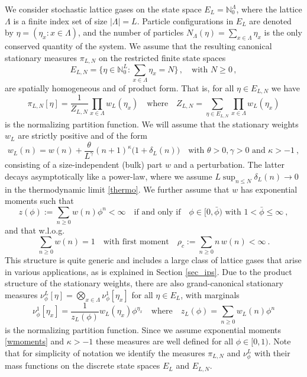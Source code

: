 \documentclass[pdflatex,sn-mathphys-num]{sn-jnl}%
\theoremstyle{thmstyleone}%
\theoremstyle{thmstyletwo}%
\theoremstyle{thmstylethree}%
\begin{document}
We consider stochastic lattice gases on the state space $E_L =\mathbb{N}_0^\Lambda$, where the lattice $\Lambda$ is a finite index set of size $|\Lambda |=L$. Particle configurations in $E_L$ are denoted by $\eta =(\eta_x :x\in\Lambda)$, and the number of particles $N_\Lambda (\eta )=\sum\limits_{x\in\Lambda} \eta_x$ is the only conserved quantity of the system. We assume that the resulting canonical stationary measures $\pi_{L,N}$ on the restricted finite state spaces
\[
    E_{L,N} = \{\eta \in \mathbb{N}_0^L: \sum_{x \in \Lambda} \eta_x = N\}\,,\quad\text{with }N\geq 0\,,
\]
are spatially homogeneous and of product form. That is, for all $\eta\in E_{L,N}$ we have
\begin{equation}\label{canon}
\pi_{L,N} [\eta ]=\frac{1}{Z_{L,N}} \prod_{x\in\Lambda} w_L (\eta_x )\quad\mbox{where}\quad Z_{L,N} =\sum_{\eta\in E_{L,N}} \prod_{x\in\Lambda} w_L (\eta_x )
\end{equation}
is the normalizing partition function. We will assume that the stationary weights $w_L$ are strictly positive and of the form
\begin{equation}\label{weights}
    w_L (n)=w(n)+\frac{\theta}{L^\gamma} (n+1)^\kappa \big( 1+\delta_L (n)\big)\quad\mbox{with }\theta 
    >0,\gamma >0\mbox{ and }\kappa >-1\ ,
\end{equation}
consisting of a size-independent (bulk) part $w$ and a perturbation. The latter decays asymptotically like a power-law, where we assume $L\sup_{n\leq N} \delta_L (n)\to 0$ in the thermodynamic limit \eqref{thermo}. We further assume that $w$ has exponential moments such that
\begin{equation}\label{exmoments}
    z(\phi ):=\sum_{n\geq 0} w(n)\phi^n <\infty\quad\mbox{if and only if}\quad\phi \in [0,\bar\phi)\mbox{ with }1<\bar\phi \leq\infty\ ,
\end{equation}
and that w.l.o.g.
\begin{equation}
\sum_{n\geq 0} w(n)=1\quad\mbox{with first moment}\quad \rho_c :=\sum_{n\geq 0} n\, w(n)<\infty\ .
\label{wmoments}    
\end{equation}
This structure is quite generic and includes a large class of lattice gases that arise in various applications, as is explained in Section \ref{sec_ips}. Due to the product structure of the stationary weights, there are also grand-canonical stationary measures $\nu^L_\phi [\eta ]= \bigotimes_{x \in \Lambda} \nu^1_{\phi} [\eta_x ]$ for all $\eta\in E_L$, with marginals
\begin{equation}
    \nu^1_{\phi} [\eta_x ]=\frac{1}{z_L (\phi )} w_L (\eta_x )\phi^{\eta_x}\quad\mbox{where}\quad z_L (\phi )=\sum_{n\geq 0} w_L (n)\phi^n
    \label{eq_grand_canonical_ensemble}
\end{equation}
is the normalizing partition function. Since we assume exponential moments \eqref{wmoments} and $\kappa >-1$ these measures are well defined for all $\phi\in [0,1)$. Note that for simplicity of notation we identify the measures $\pi_{L,N}$ and $\nu_\phi^L$ with their mass functions on the discrete state spaces $E_L$ and $E_{L,N}$.
\end{document}
